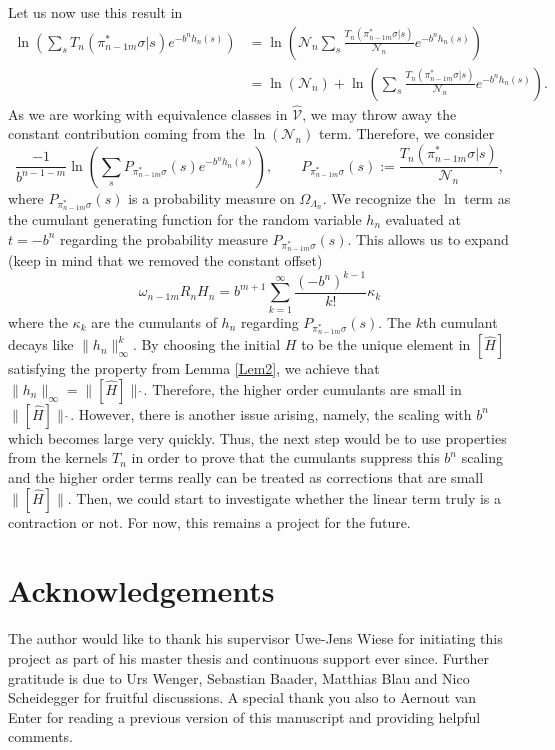\documentclass{article}
\begin{document}
Let us now use this result in
\begin{align}
    \ln\left(\sum_sT_n(\pi_{n-1m}^*\sigma|s)e^{-b^nh_n(s)}\right)&=\ln\left(\mathcal{N}_n\sum_s\frac{T_n(\pi_{n-1m}^*\sigma|s)}{\mathcal{N}_n}e^{-b^nh_n(s)}\right)\nonumber\\
    &=\ln(\mathcal{N}_n)+\ln\left(\sum_s\frac{T_n(\pi_{n-1m}^*\sigma|s)}{\mathcal{N}_n}e^{-b^nh_n(s)}\right).
\end{align}
As we are working with equivalence classes in $\hat{\mathcal{V}}$, we may throw away the constant contribution coming from the $\ln(\mathcal{N}_n)$ term. Therefore, we consider
\begin{equation}
    \frac{-1}{b^{n-1-m}}\ln\left(\sum_sP_{\pi_{n-1m}^*\sigma}(s)e^{-b^nh_n(s)}\right),\qquad P_{\pi_{n-1m}^*\sigma}(s):=\frac{T_n(\pi_{n-1m}^*\sigma|s)}{\mathcal{N}_n},
\end{equation}
where $P_{\pi_{n-1m}^*\sigma}(s)$ is a probability measure on $\Omega_{\Lambda_n}$. We recognize the $\ln$ term as the cumulant generating function for the random variable $h_n$ evaluated at $t=-b^n$ regarding the probability measure $P_{\pi_{n-1m}^*\sigma}(s)$. This allows us to expand (keep in mind that we removed the constant offset)
\begin{equation}
    \omega_{n-1m}R_nH_n=b^{m+1}\sum_{k=1}^\infty\frac{(-b^n)^{k-1}}{k!}\kappa_k
\end{equation}
where the $\kappa_k$ are the cumulants of $h_n$ regarding $P_{\pi_{n-1m}^*\sigma}(s)$. The $k$th cumulant decays like $\|h_n\|_\infty^k$. By choosing the initial $H$ to be the unique element in $[\hat H]$ satisfying the property from Lemma \ref{Lem2}, we achieve that $\|h_n\|_\infty=\|[\hat H]\|\hat{\,}$. Therefore, the higher order cumulants are small in $\|[\hat H]\|\hat{\,}$. However, there is another issue arising, namely, the scaling with $b^n$ which becomes large very quickly. Thus, the next step would be to use properties from the kernels $T_n$ in order to prove that the cumulants suppress this $b^n$ scaling and the higher order terms really can be treated as corrections that are small $\|[\hat H]\|$. Then, we could start to investigate whether the linear term truly is a contraction or not. For now, this remains a project for the future.


\section*{Acknowledgements}

The author would like to thank his supervisor Uwe-Jens Wiese for initiating this project as part of his master thesis and continuous support ever since. Further gratitude is due to Urs Wenger, Sebastian Baader, Matthias Blau and Nico Scheidegger for fruitful discussions. A special thank you also to Aernout van Enter for reading a previous version of this manuscript and providing helpful comments.




\printbibliography
\end{document}
